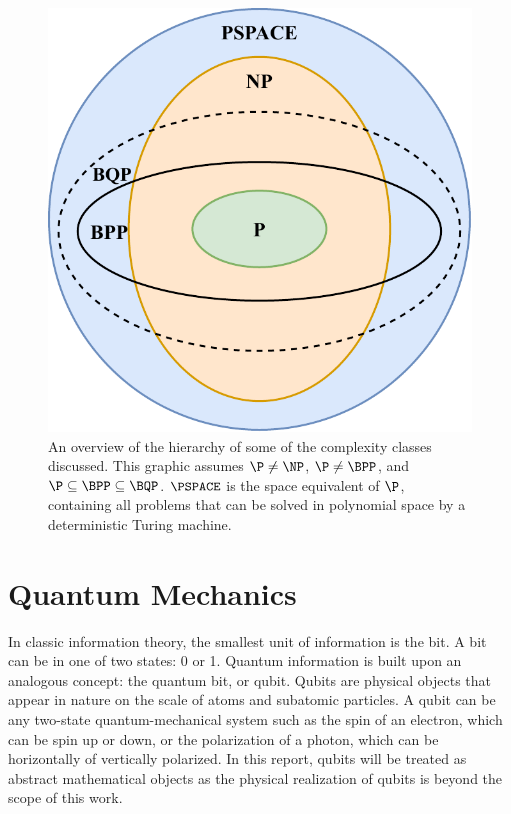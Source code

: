 \begin{figure}[ht]
    \centering
    \includegraphics[width=0.375\linewidth]{figures/complexity-classes-hierarchy.pdf}
    \caption[An overview of the hierarchy of some of the complexity classes discussed.]{An overview of the hierarchy of some of the complexity classes discussed. This graphic assumes $\P \neq \NP$, $\P \neq \BPP$, and $\P \subseteq \BPP \subseteq \BQP$. $\PSPACE$ is the space equivalent of $\P$, containing all problems that can be solved in polynomial space by a deterministic Turing machine.}
    \label{fig:complexity-classes-hierarchy}
\end{figure}

\section{Quantum Mechanics}
In classic information theory, the smallest unit of information is the bit.
A bit can be in one of two states: 0 or 1.
Quantum information is built upon an analogous concept: the quantum bit, or qubit.
Qubits are physical objects that appear in nature on the scale of atoms and subatomic particles.
A qubit can be any two-state quantum-mechanical system such as the spin of an electron, which can be spin up or down, or the polarization of a photon, which can be horizontally of vertically polarized.
In this report, qubits will be treated as abstract mathematical objects as the physical realization of qubits is beyond the scope of this work.

